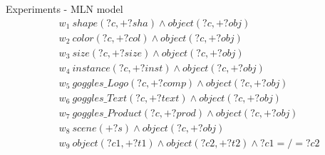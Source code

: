\documentclass[]{beamer}
\begin{document}
\begin{frame}{Experiments - MLN model}
\begin{align*}
& w_{1} \ shape(?c, +?sha) \wedge object(?c, +?obj) \\
& w_{2} \ color(?c, +?col) \wedge object(?c, +?obj) \\
& w_{3} \ size(?c, +?size) \wedge object(?c, +?obj) \\
& w_{4} \ instance(?c, +?inst) \wedge object(?c, +?obj) \\
& w_{5} \ goggles\_Logo(?c, +?comp) \wedge object(?c, +?obj)\\
& w_{6} \ goggles\_Text(?c, +?text) \wedge object(?c, +?obj)\\
& w_{7} \ goggles\_Product(?c, +?prod) \wedge object(?c, +?obj)\\
& w_{8} \ scene(+?s) \wedge object(?c, +?obj)\\
& w_{9} \ object(?c1, +?t1) \wedge object(?c2, +?t2) \wedge ?c1 =/= ?c2
\end{align*}

\end{frame}
\end{document}

